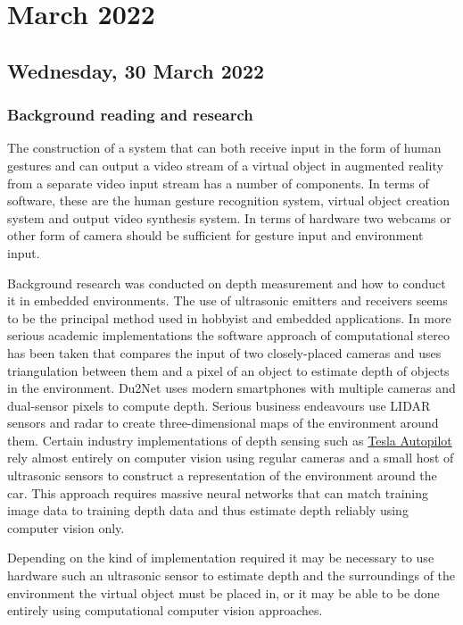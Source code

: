 \chapter[2022 March]{March 2022}

\section[2022/03/30]{Wednesday, 30 March 2022}
\label{sec:20220330}
\subsection{Background reading and research}
The construction of a system that can both receive input in the form of human gestures and can output a video stream of a virtual object in augmented reality from a separate video input stream has a number of components. In terms of software, these are the human gesture recognition system, virtual object creation system and output video synthesis system. In terms of hardware two webcams or other form of camera should be sufficient for gesture input and environment input. \newline

Background research was conducted on depth measurement and how to conduct it in embedded environments. The use of ultrasonic emitters  and receivers seems to be the principal method used in hobbyist and embedded applications. In more serious academic implementations the software approach of computational stereo has been taken that compares the input of two closely-placed cameras and uses triangulation between them and a pixel of an object to estimate depth of objects in the environment. Du2Net uses modern smartphones with multiple cameras and dual-sensor pixels to compute depth. \cite{Du2Net} Serious business endeavours use LIDAR sensors and radar to create three-dimensional maps of the environment around them. Certain industry implementations of depth sensing such as \href{https://www.tesla.com/autopilot}{Tesla Autopilot} rely almost entirely on computer vision using regular cameras and a small host of ultrasonic sensors to construct a representation of the environment around the car. This approach requires massive neural networks that can match training image data to training depth data and thus estimate depth reliably using computer vision only. \newline

Depending on the kind of implementation required it may be necessary to use hardware such an ultrasonic sensor to estimate depth and the surroundings of the environment the virtual object must be placed in, or it may be able to be done entirely using computational computer vision approaches. 


